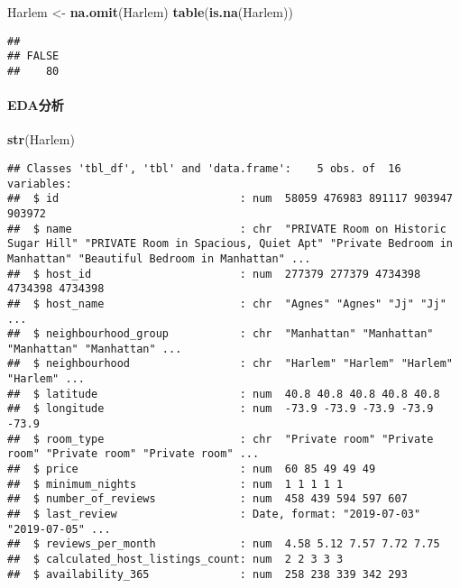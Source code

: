 \documentclass[]{article}
\newenvironment{Shaded}{\begin{snugshade}}{\end{snugshade}}
\newcommand{\KeywordTok}[1]{\textcolor[rgb]{0.13,0.29,0.53}{\textbf{#1}}}
\newcommand{\NormalTok}[1]{#1}
\newcommand{\StringTok}[1]{\textcolor[rgb]{0.31,0.60,0.02}{#1}}
\let\oldparagraph\paragraph
\renewcommand{\paragraph}[1]{\oldparagraph{#1}\mbox{}}
\begin{document}
\begin{Shaded}
\begin{Highlighting}[]
\NormalTok{Harlem <-}\StringTok{ }\KeywordTok{na.omit}\NormalTok{(Harlem)}
\KeywordTok{table}\NormalTok{(}\KeywordTok{is.na}\NormalTok{(Harlem))}
\end{Highlighting}
\end{Shaded}

\begin{verbatim}
## 
## FALSE 
##    80
\end{verbatim}

\hypertarget{edaux5206ux6790-1}{%
\paragraph{EDA分析}\label{edaux5206ux6790-1}}

\begin{Shaded}
\begin{Highlighting}[]
\KeywordTok{str}\NormalTok{(Harlem)}
\end{Highlighting}
\end{Shaded}

\begin{verbatim}
## Classes 'tbl_df', 'tbl' and 'data.frame':    5 obs. of  16 variables:
##  $ id                            : num  58059 476983 891117 903947 903972
##  $ name                          : chr  "PRIVATE Room on Historic Sugar Hill" "PRIVATE Room in Spacious, Quiet Apt" "Private Bedroom in Manhattan" "Beautiful Bedroom in Manhattan" ...
##  $ host_id                       : num  277379 277379 4734398 4734398 4734398
##  $ host_name                     : chr  "Agnes" "Agnes" "Jj" "Jj" ...
##  $ neighbourhood_group           : chr  "Manhattan" "Manhattan" "Manhattan" "Manhattan" ...
##  $ neighbourhood                 : chr  "Harlem" "Harlem" "Harlem" "Harlem" ...
##  $ latitude                      : num  40.8 40.8 40.8 40.8 40.8
##  $ longitude                     : num  -73.9 -73.9 -73.9 -73.9 -73.9
##  $ room_type                     : chr  "Private room" "Private room" "Private room" "Private room" ...
##  $ price                         : num  60 85 49 49 49
##  $ minimum_nights                : num  1 1 1 1 1
##  $ number_of_reviews             : num  458 439 594 597 607
##  $ last_review                   : Date, format: "2019-07-03" "2019-07-05" ...
##  $ reviews_per_month             : num  4.58 5.12 7.57 7.72 7.75
##  $ calculated_host_listings_count: num  2 2 3 3 3
##  $ availability_365              : num  258 238 339 342 293
\end{verbatim}
\end{document}
